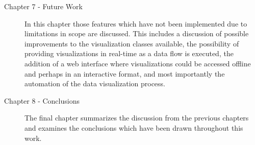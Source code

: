 \begin{description}
\item[Chapter 7 - Future Work] In this chapter those features which have not been implemented due to limitations in scope are discussed. This includes a discussion of possible improvements to the visualization classes available, the possibility of providing visualizations in real-time as a data flow is executed, the addition of a web interface where visualizations could be accessed offline and perhaps in an interactive format, and most importantly the automation of the data visualization process.
\\

\item[Chapter 8 - Conclusions] The final chapter summarizes the discussion from the previous chapters and examines the conclusions which have been drawn throughout this work. 


\end{description}